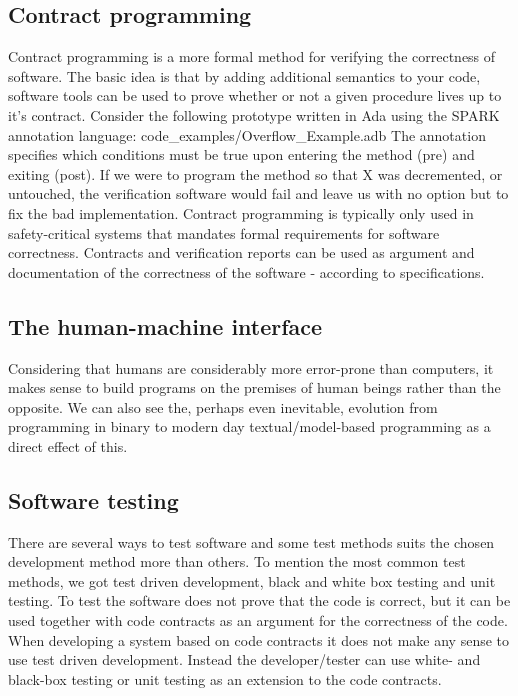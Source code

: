 \documentclass[10pt,a4paper]{article}
\begin{document}
\subsection{Contract programming}
Contract programming is a more formal method for verifying the correctness of software.
The basic idea is that by adding additional semantics to your code, software tools can be used to prove whether or not a given procedure lives up to it's contract.
Consider the following prototype written in Ada using the SPARK annotation language:
 {code_examples/Overflow_Example.adb}
The annotation specifies which conditions must be true upon entering the method (pre) and exiting (post). If we were to program the method so that X was decremented, or untouched, the verification software would fail and leave us with no option but to fix the bad implementation.
Contract programming is typically only used in safety-critical systems that mandates formal requirements for software correctness. Contracts and verification reports can be used as argument and documentation of the correctness of the software - according to specifications.

\subsection{The human-machine interface}
Considering that humans are considerably more error-prone than computers, it makes sense to build programs on the premises of human beings rather than the opposite. We can also see the, perhaps even inevitable, evolution from programming in binary to modern day textual/model-based programming as a direct effect of this.

\subsection{Software testing}
There are several ways to test software and some test methods suits the chosen development method more than others. To mention the most common test methods, we got test driven development, black and white box testing and unit testing.
To test the software does not prove that the code is correct, but it can be used together with code contracts as an argument for the correctness of the code.
When developing a system based on code contracts it does not make any sense to use test driven development. Instead the developer/tester can use white- and black-box testing or unit testing as an extension to the code contracts.
 
\end{document}
